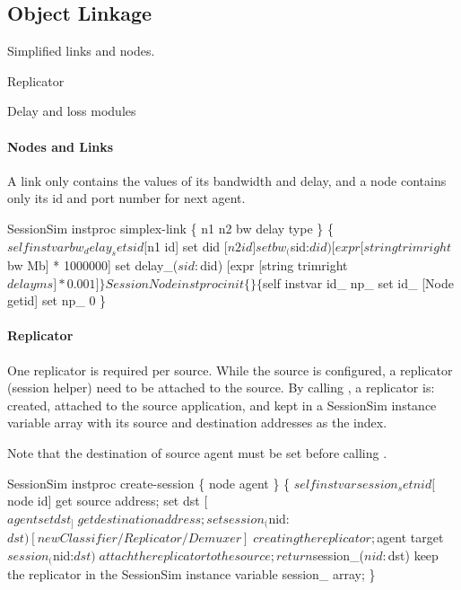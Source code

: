 \subsection{Object Linkage}
\label{sec:session-objlink}

\begin{list}{}{}
\item  Simplified links and nodes.
\item  Replicator
\item  Delay and loss modules
\end{list}

\paragraph{Nodes and Links}
A link only contains the values of
its bandwidth and delay, and a node contains only its id and port number
for next agent.

\begin{program}
SessionSim instproc simplex-link \{ n1 n2 bw delay type \} \{
    $self instvar bw_ delay_
    set sid [$n1 id]
    set did [$n2 id]

    set bw_($sid:$did) [expr [string trimright $bw Mb] * 1000000]
    set delay_($sid:$did) [expr [string trimright $delay ms] * 0.001]
\}

SessionNode instproc init \{\} \{
    $self instvar id_ np_
    set id_ [Node getid]
    set np_ 0
\}
\end{program}

\paragraph{Replicator}
One replicator is required per source.  While the source is configured,
a replicator (session helper) need to be attached to the source.  By
calling , a replicator is:
created,
attached to the source application, and 
kept in a SessionSim instance variable  array with 
its source and destination addresses as the index.

Note that the destination of source agent must be set before
calling .

\begin{program}
SessionSim instproc create-session \{ node agent \} \{
    $self instvar session_

    set nid [$node id]                           \; get source address;
    set dst [$agent set dst_]                    \; get destination address;
    set session_($nid:$dst) [new Classifier/Replicator/Demuxer]  \; creating the replicator;
    $agent target $session_($nid:$dst)           \; attach the replicator to the source;
    return $session_($nid:$dst) \; keep the replicator in the SessionSim instance variable session_ array;
\}
\end{program}

